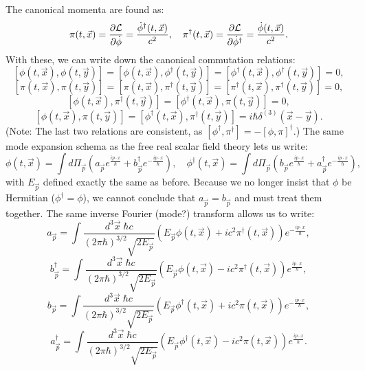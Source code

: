 \documentclass[11pt]{article}
\begin{document}
The canonical momenta are found as:
\[
    \pi(t,\vec{x})
    = \frac{\partial\mathcal{L}}{\partial\dot{\phi}}
    = \frac{\dot{\phi}^\dagger(t,\vec{x})}{c^2},\quad
    \pi^\dagger(t,\vec{x})
    = \frac{\partial\mathcal{L}}{\partial\dot{\phi}^\dagger}
    = \frac{\dot{\phi}(t,\vec{x})}{c^2}.
\]
With these, we can write down the canonical commutation relations:
\[
    [\phi(t,\vec{x}),\phi(t,\vec{y})] = [\phi(t,\vec{x}),\phi^\dagger(t,\vec{y})]
    = [\phi^\dagger(t,\vec{x}),\phi^\dagger(t,\vec{y})] = 0,
\]
\[
    [\pi(t,\vec{x}),\pi(t,\vec{y})] = [\pi(t,\vec{x}),\pi^\dagger(t,\vec{y})]
    = [\pi^\dagger(t,\vec{x}),\pi^\dagger(t,\vec{y})] = 0,
\]
\[
    [\phi(t,\vec{x}),\pi^\dagger(t,\vec{y})] = [\phi^\dagger(t,\vec{x}),\pi(t,\vec{y})]
    = 0,
\]
\[
    [\phi(t,\vec{x}),\pi(t,\vec{y})] = [\phi^\dagger(t,\vec{x}),\pi^\dagger(t,\vec{y})]
    = i\hbar\delta^{(3)}(\vec{x}-\vec{y}).
\]
(Note: The last two relations are consistent, as $[\phi^\dagger,\pi^\dagger] = -[\phi,\pi]^\dagger$.)
The same mode expansion schema as the free real scalar field theory lets us write:
\[
    \phi(t,\vec{x})
    = \int d\Pi_{\vec{p}} \left(
        a_{\vec{p}}e^{\frac{ip\cdot x}{\hbar}}
        + b_{\vec{p}}^\dagger e^{-\frac{ip\cdot x}{\hbar}}
    \right),\quad
    \phi^\dagger(t,\vec{x})
    = \int d\Pi_{\vec{p}} \left(
        b_{\vec{p}}e^{\frac{ip\cdot x}{\hbar}}
        + a_{\vec{p}}^\dagger e^{-\frac{ip\cdot x}{\hbar}}
    \right),
\]
with $E_{\vec{p}}$ defined exactly the same as before.
Because we no longer insist that $\phi$ be Hermitian ($\phi^\dagger=\phi$),
we cannot conclude that $a_{\vec{p}} = b_{\vec{p}}$ and must treat them together.
The same inverse Fourier (mode?) transform allows us to write:
\[
    a_{\vec{p}} = \int\frac{d^3\vec{x}\;\hbar c}{(2\pi\hbar)^{3/2}\sqrt{2E_{\vec{p}}}}
        \left(
            E_{\vec{p}}\phi(t,\vec{x}) + ic^2\pi^\dagger(t,\vec{x})
        \right) e^{-\frac{ip\cdot x}{\hbar}},
\]
\[
    b_{\vec{p}}^\dagger = \int\frac{d^3\vec{x}\;\hbar c}{(2\pi\hbar)^{3/2}\sqrt{2E_{\vec{p}}}}
        \left(
            E_{\vec{p}}\phi(t,\vec{x}) - ic^2\pi^\dagger(t,\vec{x})
        \right) e^{\frac{ip\cdot x}{\hbar}},
\]
\[
    b_{\vec{p}} = \int\frac{d^3\vec{x}\;\hbar c}{(2\pi\hbar)^{3/2}\sqrt{2E_{\vec{p}}}}
        \left(
            E_{\vec{p}}\phi^\dagger(t,\vec{x}) + ic^2\pi(t,\vec{x})
        \right) e^{-\frac{ip\cdot x}{\hbar}},
\]
\[
    a_{\vec{p}}^\dagger = \int\frac{d^3\vec{x}\;\hbar c}{(2\pi\hbar)^{3/2}\sqrt{2E_{\vec{p}}}}
        \left(
            E_{\vec{p}}\phi^\dagger(t,\vec{x}) - ic^2\pi(t,\vec{x})
        \right) e^{\frac{ip\cdot x}{\hbar}}.
\]
\end{document}
